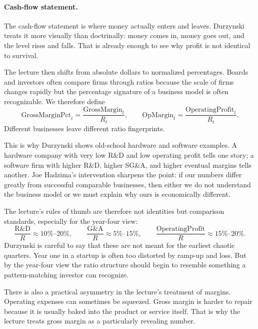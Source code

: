\paragraph{Cash-flow statement.}
The cash-flow statement is where money actually enters and leaves. Durzynski treats it more visually than doctrinally: money comes in, money goes out, and the level rises and falls. That is already enough to see why profit is not identical to survival.

The lecture then shifts from absolute dollars to normalized percentages. Boards and investors often compare firms through ratios because the scale of firms changes rapidly but the percentage signature of a business model is often recognizable. We therefore define
\begin{equation}
\mathrm{GrossMarginPct}_t = \frac{\mathrm{GrossMargin}_t}{R_t},
\qquad
\mathrm{OpMargin}_t = \frac{\mathrm{OperatingProfit}_t}{R_t}.
\end{equation}
Different businesses leave different ratio fingerprints.

This is why Durzynski shows old-school hardware and software examples. A hardware company with very low R\&D and low operating profit tells one story; a software firm with higher R\&D, higher SG\&A, and higher eventual margins tells another. Joe Hadzima's intervention sharpens the point: if our numbers differ greatly from successful comparable businesses, then either we do not understand the business model or we must explain why ours is economically different.

The lecture's rules of thumb are therefore not identities but comparison standards, especially for the year-four view:
\begin{equation}
\frac{\mathrm{R\&D}}{R} \approx 10\%\text{--}20\%,
\qquad
\frac{\mathrm{G\&A}}{R} \approx 5\%\text{--}15\%,
\qquad
\frac{\mathrm{OperatingProfit}}{R} \approx 15\%\text{--}20\%.
\end{equation}
Durzynski is careful to say that these are not meant for the earliest chaotic quarters. Year one in a startup is often too distorted by ramp-up and loss. But by the year-four view the ratio structure should begin to resemble something a pattern-matching investor can recognize.

There is also a practical asymmetry in the lecture's treatment of margins. Operating expenses can sometimes be squeezed. Gross margin is harder to repair because it is usually baked into the product or service itself. That is why the lecture treats gross margin as a particularly revealing number.

